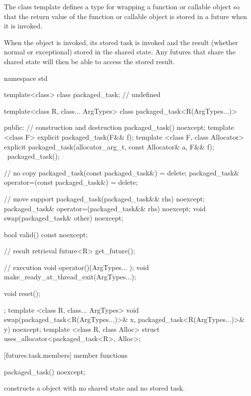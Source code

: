 \pnum
The class template  defines a type for wrapping a function or
callable object so that the return value of the function or callable object is stored in
a future when it is invoked.

\pnum
When the  object is invoked, its stored task is invoked and the
result (whether normal or exceptional) stored in the shared state. Any futures that
share the shared state will then be able to access the stored result.

\begin{codeblock}
namespace std {
  template<class> class packaged_task; // undefined

  template<class R, class... ArgTypes>
  class packaged_task<R(ArgTypes...)> {
  public:
    // construction and destruction
    packaged_task() noexcept;
    template <class F>
      explicit packaged_task(F&& f);
    template <class F, class Allocator>
      explicit packaged_task(allocator_arg_t, const Allocator& a, F&& f);
    ~packaged_task();

    // no copy
    packaged_task(const packaged_task&) = delete;
    packaged_task& operator=(const packaged_task&) = delete;

    // move support
    packaged_task(packaged_task&& rhs) noexcept;
    packaged_task& operator=(packaged_task&& rhs) noexcept;
    void swap(packaged_task& other) noexcept;

    bool valid() const noexcept;

    // result retrieval
    future<R> get_future();        

    // execution
    void operator()(ArgTypes... );
    void make_ready_at_thread_exit(ArgTypes...);

    void reset();
  };
  template <class R, class... ArgTypes>
    void swap(packaged_task<R(ArgTypes...)>& x, packaged_task<R(ArgTypes...)>& y) noexcept;
  template <class R, class Alloc>
    struct uses_allocator<packaged_task<R>, Alloc>;
}
\end{codeblock}

[futures.task.members]{ member functions}

%
\begin{itemdecl}
packaged_task() noexcept;
\end{itemdecl}

\begin{itemdescr}
\pnum
\effects constructs a  object with no shared state and no stored task.
\end{itemdescr}

